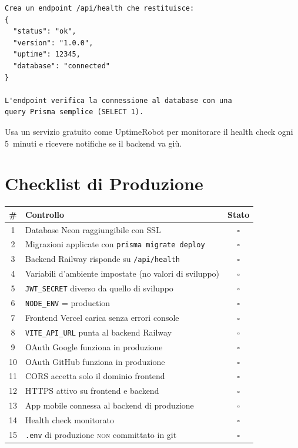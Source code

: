 \begin{praticabox}[title={Pratica --- Health check}]
\begin{lstlisting}[language={}]
Crea un endpoint /api/health che restituisce:
{
  "status": "ok",
  "version": "1.0.0",
  "uptime": 12345,
  "database": "connected"
}

L'endpoint verifica la connessione al database con una
query Prisma semplice (SELECT 1).
\end{lstlisting}
\end{praticabox}

Usa un servizio gratuito come UptimeRobot per monitorare il health check ogni 5~minuti e ricevere notifiche se il backend va giù.

\section{Checklist di Produzione}

\begin{praticabox}[title={Pratica --- Verifica completa}]
\begin{center}
\begin{small}
\begin{tabularx}{\textwidth}{c X c}
\toprule
\textbf{\#} & \textbf{Controllo} & \textbf{Stato} \\
\midrule
1 & Database Neon raggiungibile con SSL & $\square$ \\
2 & Migrazioni applicate con \texttt{prisma migrate deploy} & $\square$ \\
3 & Backend Railway risponde su \texttt{/api/health} & $\square$ \\
4 & Variabili d'ambiente impostate (no valori di sviluppo) & $\square$ \\
5 & \texttt{JWT\_SECRET} diverso da quello di sviluppo & $\square$ \\
6 & \texttt{NODE\_ENV} = production & $\square$ \\
7 & Frontend Vercel carica senza errori console & $\square$ \\
8 & \texttt{VITE\_API\_URL} punta al backend Railway & $\square$ \\
9 & OAuth Google funziona in produzione & $\square$ \\
10 & OAuth GitHub funziona in produzione & $\square$ \\
11 & CORS accetta solo il dominio frontend & $\square$ \\
12 & HTTPS attivo su frontend e backend & $\square$ \\
13 & App mobile connessa al backend di produzione & $\square$ \\
14 & Health check monitorato & $\square$ \\
15 & \texttt{.env} di produzione \textsc{non} committato in git & $\square$ \\
\bottomrule
\end{tabularx}
\end{small}
\end{center}
\end{praticabox}

